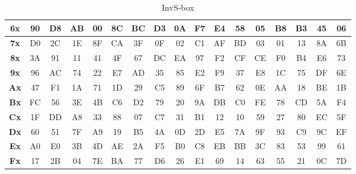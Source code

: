\documentclass[peerreview]{IEEEtran}
\begin{document}
\begin{table}[ht]
{\begin{tabular}{|c|c|c|c|c|c|c|c|c|c|c|c|c|c|c|c|c|}
			\textbf{6x} & 90         & D8         & AB         & 00         & 8C         & BC         & D3         & 0A         & F7         & E4         & 58         & 05         & B8         & B3         & 45         & 06         \\ \hline
			\textbf{7x} & D0         & 2C         & 1E         & 8F         & CA         & 3F         & 0F         & 02         & C1         & AF         & BD         & 03         & 01         & 13         & 8A         & 6B         \\ \hline
			\textbf{8x} & 3A         & 91         & 11         & 41         & 4F         & 67         & DC         & EA         & 97         & F2         & CF         & CE         & F0         & B4         & E6         & 73         \\ \hline
			\textbf{9x} & 96         & AC         & 74         & 22         & E7         & AD         & 35         & 85         & E2         & F9         & 37         & E8         & 1C         & 75         & DF         & 6E         \\ \hline
			\textbf{Ax} & 47         & F1         & 1A         & 71         & 1D         & 29         & C5         & 89         & 6F         & B7         & 62         & 0E         & AA         & 18         & BE         & 1B         \\ \hline
			\textbf{Bx} & FC         & 56         & 3E         & 4B         & C6         & D2         & 79         & 20         & 9A         & DB         & C0         & FE         & 78         & CD         & 5A         & F4         \\ \hline
			\textbf{Cx} & 1F         & DD         & A8         & 33         & 88         & 07         & C7         & 31         & B1         & 12         & 10         & 59         & 27         & 80         & EC         & 5F         \\ \hline
			\textbf{Dx} & 60         & 51         & 7F         & A9         & 19         & B5         & 4A         & 0D         & 2D         & E5         & 7A         & 9F         & 93         & C9         & 9C         & EF         \\ \hline
			\textbf{Ex} & A0         & E0         & 3B         & 4D         & AE         & 2A         & F5         & B0         & C8         & EB         & BB         & 3C         & 83         & 53         & 99         & 61         \\ \hline
			\textbf{Fx} & 17         & 2B         & 04         & 7E         & BA         & 77         & D6         & 26         & E1         & 69         & 14         & 63         & 55         & 21         & 0C         & 7D         \\ \hline
		\end{tabular}
	}
	\caption{InvS-box}
	\label{tab:cuadro5}
\end{table}
\end{document}
